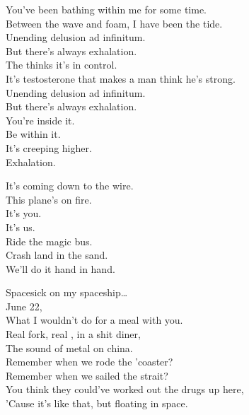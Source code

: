
You've been bathing within me for some time. \\
Between the wave and foam, I have been the tide. \\
Unending delusion ad infinitum. \\
But there's always exhalation. \\
The  thinks it's in control. \\
It's testosterone that makes a man think he's strong. \\
Unending delusion ad infinitum. \\
But there's always exhalation. \\

You're inside it. \\
Be within it. \\
It's creeping higher. \\
Exhalation. \\


It's coming down to the wire. \\
This plane's on fire. \\
It's you. \\
It's us. \\
Ride the magic bus. \\
Crash land in the sand. \\
We'll do it hand in hand. \\





Spacesick on my spaceship… \\

June 22, \\
What I wouldn't do for a meal with you. \\
Real fork, real , in a shit diner, \\
The sound of metal on china. \\
Remember when we rode the 'coaster? \\
Remember when we sailed the strait? \\
You think they could've worked out the drugs up here, \\
'Cause it's like that, but floating in space. \\

